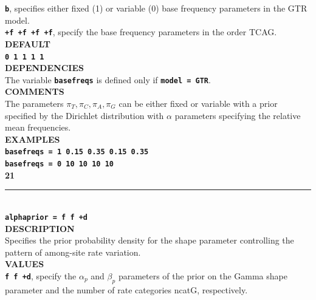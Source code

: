 \documentclass[a4paper]{book}
\numberwithin{equation}{section} \renewcommand{\baselinestretch}{0.55}
\begin{document}
\textbf{\texttt{b}}, specifies either fixed (1) or variable (0) base frequency parameters in the GTR model. \vspace{5pt}\\
\textbf{\texttt{+f +f +f +f}}, specify the base frequency parameters in the order TCAG. \vspace{5pt}\\
\textbf{DEFAULT} \vspace{5pt}\\
\textbf{\texttt{0 1 1 1 1}} \vspace{5pt}\\
\textbf{DEPENDENCIES} \vspace{5pt}\\
The variable \textbf{\texttt{basefreqs}} is defined only if
\textbf{\texttt{model = GTR}}.
\vspace{5pt}\\
\textbf{COMMENTS} \vspace{5pt}\\
The parameters $\pi_T, \pi_C, \pi_A, \pi_G$ can be either fixed or
variable with a prior specified by the Dirichlet distribution
with $\alpha$ parameters specifying the relative mean frequencies. \vspace{5pt}\\
\textbf{EXAMPLES} \vspace{5pt}\\
\textbf{\texttt{basefreqs = 1 0.15 0.35 0.15 0.35 }} \vspace{5pt}\\
\textbf{\texttt{basefreqs = 0  10  10 10  10 }}\vspace{10pt}\\
\textbf{{\large 21}} \\
\noindent\rule{\textwidth}{0.8pt} \\
\textbf{{\Large \texttt{alphaprior = f f +d }}} \vspace{5pt}\\
\textbf{DESCRIPTION} \vspace{5pt}\\
Specifies the prior probability density for the shape parameter
controlling the pattern of among-site rate variation.
\vspace{5pt}\\
\textbf{VALUES} \vspace{5pt}\\
\textbf{\texttt{f f +d}}, specify the $\alpha_p$ and $\beta_p$
parameters of the prior on the Gamma shape parameter and the number of
rate
categories ncatG, respectively. \vspace{5pt}\\
\end{document}
